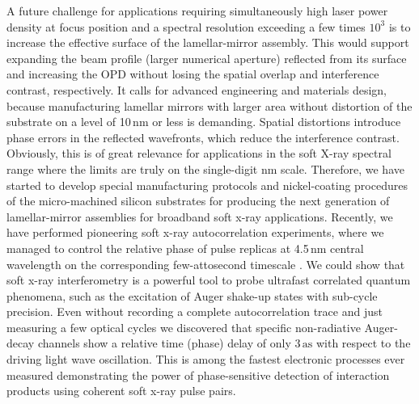 \documentclass[fleqn,10pt]{wlscirep}
\begin{document}
A future challenge for applications requiring simultaneously high laser power density at focus position and a spectral resolution exceeding a few times $10^{3}$ is to increase the effective surface of the lamellar-mirror assembly. This would support expanding the beam profile (larger numerical aperture) reflected from its surface and increasing the OPD without losing the spatial overlap and interference contrast, respectively. It calls for advanced engineering and materials design, because manufacturing lamellar mirrors with larger area without distortion of the substrate on a level of 10\,nm or less is demanding. Spatial distortions introduce phase errors in the reflected wavefronts, which reduce the interference contrast. Obviously, this is of great relevance for applications in the soft X-ray spectral range where the limits are truly on the single-digit nm scale. Therefore, we have started to develop special manufacturing protocols and nickel-coating procedures of the micro-machined silicon substrates for producing the next generation of lamellar-mirror assemblies for broadband soft x-ray applications. Recently, we have performed pioneering soft x-ray autocorrelation experiments, where we managed to control the relative phase of pulse replicas at 4.5\,nm central wavelength on the corresponding few-attosecond timescale \cite{Usenko2020}. We could show that soft x-ray interferometry is a powerful tool to probe ultrafast correlated quantum phenomena, such as the excitation of Auger shake-up states with sub-cycle precision. Even without recording a complete autocorrelation trace and just measuring a few optical cycles we discovered that specific non-radiative Auger-decay channels show a relative time (phase) delay of only $\mathrm{3\,as}$ with respect to the driving light wave oscillation. This is among the fastest electronic processes ever measured demonstrating the power of phase-sensitive detection of interaction products using coherent soft x-ray pulse pairs.\\
\end{document}
